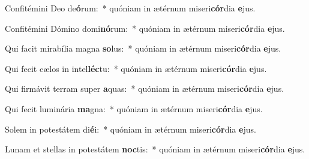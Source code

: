 \item Confitémini Deo de\textbf{ó}rum:~* quóniam in ætérnum miseri\textbf{cór}dia \textbf{e}jus.
\item Confitémini Dómino domi\textbf{nó}rum:~* quóniam in ætérnum miseri\textbf{cór}dia \textbf{e}jus.
\item Qui facit mirabília magna \textbf{so}lus:~* quóniam in ætérnum miseri\textbf{cór}dia \textbf{e}jus.
\item Qui fecit cælos in intel\textbf{léc}tu:~* quóniam in ætérnum miseri\textbf{cór}dia \textbf{e}jus.
\item Qui firmávit terram super \textbf{a}quas:~* quóniam in ætérnum miseri\textbf{cór}dia \textbf{e}jus.
\item Qui fecit luminária \textbf{ma}gna:~* quóniam in ætérnum miseri\textbf{cór}dia \textbf{e}jus.
\item Solem in potestátem di\textbf{é}i:~* quóniam in ætérnum miseri\textbf{cór}dia \textbf{e}jus.
\item Lunam et stellas in potestátem \textbf{noc}tis:~* quóniam in ætérnum miseri\textbf{cór}dia \textbf{e}jus.
